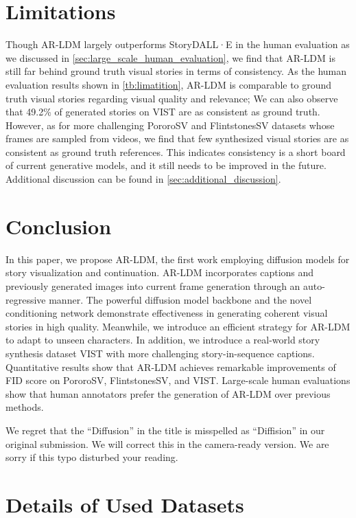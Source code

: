 \documentclass[10pt,twocolumn,letterpaper]{article}
\begin{document}
\section{Limitations}
Though AR-LDM largely outperforms StoryDALL·E in the human evaluation as we discussed in \cref{sec:large_scale_human_evaluation}, we find that AR-LDM is still far behind ground truth visual stories in terms of consistency. As the human evaluation results shown in \cref{tb:limatition}, AR-LDM is comparable to ground truth visual stories regarding visual quality and relevance; We can also observe that 49.2\% of generated stories on VIST are as consistent as ground truth. However, as for more challenging PororoSV and FlintstonesSV datasets whose frames are sampled from videos, we find that few synthesized visual stories are as consistent as ground truth references. This indicates consistency is a short board of current generative models, and it still needs to be improved in the future. Additional discussion can be found in \cref{sec:additional_discussion}.


\section{Conclusion}
In this paper, we propose AR-LDM, the first work employing diffusion models for story visualization and continuation. AR-LDM incorporates captions and previously generated images into current frame generation through an auto-regressive manner. The powerful diffusion model backbone and the novel conditioning network demonstrate effectiveness in generating coherent visual stories in high quality. Meanwhile, we introduce an efficient strategy for AR-LDM to adapt to unseen characters. In addition, we introduce a real-world story synthesis dataset VIST with more challenging story-in-sequence captions. Quantitative results show that AR-LDM achieves remarkable improvements of FID score on PororoSV, FlintstonesSV, and VIST. Large-scale human evaluations show that human annotators prefer the generation of AR-LDM over previous methods. 
\clearpage
{\small


}
\clearpage
\appendix
We regret that the ``Diffusion'' in the title is misspelled as ``Diffision'' in our original submission. We will correct this in the camera-ready version. We are sorry if this typo disturbed your reading.
\section{Details of Used Datasets}
\label{sec:detail_of_used_datasets}
\end{document}
